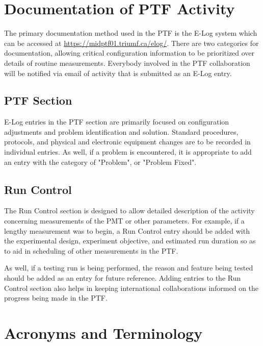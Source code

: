 \documentclass[twoside,letterpaper]{refart}
\begin{document}
\clearpage
\section{Documentation of PTF Activity}

The primary documentation method used in the PTF is the E-Log system which can be accessed at \url{https://midptf01.triumf.ca/elog/}.  There are two categories for documentation, allowing critical configuration information to be prioritized over details of routine measurements. Everybody involved in the PTF collaboration will be notified via email of activity that is submitted as an E-Log entry.

\subsection{PTF Section}

E-Log entries in the PTF section are primarily focused on configuration adjustments and problem identification and solution.  Standard procedures, protocols, and physical and electronic equipment changes are to be recorded in individual entries.  As well, if a problem is encountered, it is appropriate to add an entry with the category of "Problem", or "Problem Fixed".

\subsection{Run Control}

The Run Control section is designed to allow detailed description of the activity concerning measurements of the PMT or other parameters.  For example, if a lengthy measurement was to begin, a Run Control entry should be added with the experimental design, experiment objective, and estimated run duration so as to aid in scheduling of other measurements in the PTF.  

As well, if a testing run is being performed, the reason and feature being tested should be added as an entry for future reference.  Adding entries to the Run Control section also helps in keeping international collaborations informed on the progress being made in the PTF.

\newpage

\appendix

\section{Acronyms and Terminology} \label{Terminology}
\end{document}
